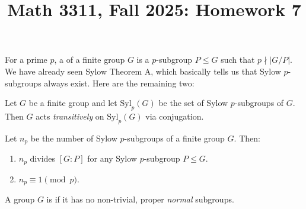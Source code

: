 \documentclass{amsart}
\title{Math 3311, Fall 2025: Homework 7}
\begin{document}
\maketitle

For a prime $p$, a  of a finite group $G$ is a $p$-subgroup $P\leq G$ such that $p\nmid |G/P|$. We have already seen Sylow Theorem A, which basically tells us that Sylow $p$-subgroups always exist. Here are the remaining two:

\begin{introthm}
Let $G$ be a finite group and let $\mathrm{Syl}_p(G)$ be the set of Sylow $p$-subgroups of $G$. Then $G$ acts \emph{transitively} on $\mathrm{Syl}_p(G)$ via conjugation.
\end{introthm}

\begin{introthm}
Let $n_p$ be the number of Sylow $p$-subgroups of a finite group $G$. Then:
\begin{enumerate}
	\item $n_p$ divides $[G:P]$ for any Sylow $p$-subgroup $P\leq G$.
	\item $n_p\equiv 1 \pmod{p}$.
\end{enumerate}
\end{introthm}	

\begin{definition}
	A group $G$ is  if it has no non-trivial, proper \emph{normal} subgroups.
\end{definition}
\end{document}
